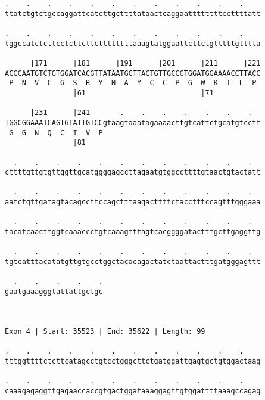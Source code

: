 \documentclass{article}
\begin{document}
\begin{Verbatim}
.    .    .    .    .    .    .    .    .    .    .    .    
ttatctgtctgccaggattcatcttgcttttataactcaggaattttttttccttttatt
                                                            
.    .    .    .    .    .    .    .    .    .    .    .    
tggccatctcttcctcttcttcttttttttaaagtatggaattcttctgtttttgtttta
                                                            
      |171      |181      |191      |201      |211      |221
ACCCAATGTCTGTGGATCACGTTATAATGCTTACTGTTGCCCTGGATGGAAAACCTTACC
 P  N  V  C  G  S  R  Y  N  A  Y  C  C  P  G  W  K  T  L  P 
                |61                           |71           
  
      |231      |241       .    .    .    .    .    .    .  
TGGCGGAAATCAGTGTATTGTCCgtaagtaaatagaaaacttgtcattctgcatgtcctt
 G  G  N  Q  C  I  V  P                                     
                |81                                         
  
  .    .    .    .    .    .    .    .    .    .    .    .  
cttttgttgtgttggttgcatggggagccttagaatgtggccttttgtaactgtactatt
                                                            
  .    .    .    .    .    .    .    .    .    .    .    .  
aatctgttgatagtacagccttccagctttaagacttttctacctttccagtttgggaaa
                                                            
  .    .    .    .    .    .    .    .    .    .    .    .  
tacatcaacttggtcaaaccctgtcaaagtttagtcacggggatactttgcttgaggttg
                                                            
  .    .    .    .    .    .    .    .    .    .    .    .  
tgtcatttacatatgttgtgcctggctacacagactatctaattactttgatgggagttt
                                                            
  .    .    .    .    .
gaatgaaagggtattattgctgc
                       
                       
 
Exon 4 | Start: 35523 | End: 35622 | Length: 99
 
.    .    .    .    .    .    .    .    .    .    .    .    
tttggttttctcttcatagcctgtcctgggcttctgatggattgagtgctgtggactaag
                                                            
.    .    .    .    .    .    .    .    .    .    .    .    
caaagagaggttgagaaccaccgtgactggataaaggagttgtggattttaaagccagag
                                                            

\end{Verbatim}
\end{document}
